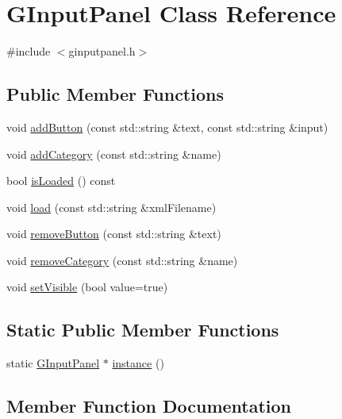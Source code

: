 \hypertarget{classGInputPanel}{}\section{G\+Input\+Panel Class Reference}
\label{classGInputPanel}


{\ttfamily \#include $<$ginputpanel.\+h$>$}

\subsection*{Public Member Functions}
\begin{DoxyCompactItemize}
\item 
void \mbox{\hyperlink{classGInputPanel_a7f12a7d47bab0b3d473f3bf2512cf6a5}{add\+Button}} (const std\+::string \&text, const std\+::string \&input)
\item 
void \mbox{\hyperlink{classGInputPanel_a6374a32799da00678a7f8856d54240f9}{add\+Category}} (const std\+::string \&name)
\item 
bool \mbox{\hyperlink{classGInputPanel_af4529478109e5691162fef4acf9bf0c5}{is\+Loaded}} () const
\item 
void \mbox{\hyperlink{classGInputPanel_a52bd48893438cece88605e4dcb2cb67a}{load}} (const std\+::string \&xml\+Filename)
\item 
void \mbox{\hyperlink{classGInputPanel_a5ed3beebe80709d3fb661016fd090f18}{remove\+Button}} (const std\+::string \&text)
\item 
void \mbox{\hyperlink{classGInputPanel_a8ba2189afec64ec160945832c5f64a8d}{remove\+Category}} (const std\+::string \&name)
\item 
void \mbox{\hyperlink{classGInputPanel_acf3237f534b3039d9ff3bcd9abc77800}{set\+Visible}} (bool value=true)
\end{DoxyCompactItemize}
\subsection*{Static Public Member Functions}
\begin{DoxyCompactItemize}
\item 
static \mbox{\hyperlink{classGInputPanel}{G\+Input\+Panel}} $\ast$ \mbox{\hyperlink{classGInputPanel_aaac6dfbe52b6dad727a856bcc72c1553}{instance}} ()
\end{DoxyCompactItemize}


\subsection{Member Function Documentation}
\mbox{\label{classGInputPanel_a7f12a7d47bab0b3d473f3bf2512cf6a5}} 
